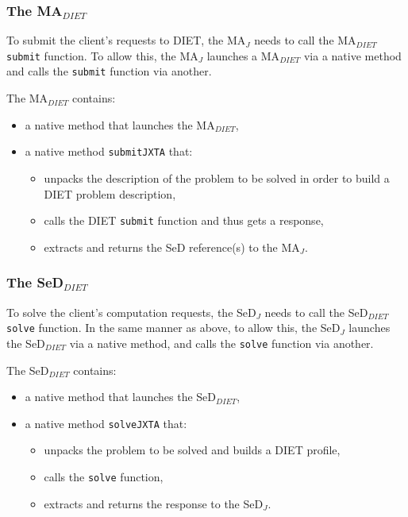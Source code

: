 \subsubsection{The MA$_{DIET}$}
\label{sssec:jnima}

To submit the client's requests to DIET, the MA$_{J}$ needs to call
the MA$_{DIET}$  \texttt{submit} function. To allow this, the MA$_{J}$
launches a MA$_{DIET}$ via a native method and calls the
\texttt{submit} function via another.

The MA$_{DIET}$ contains:

\begin{itemize}
\item{a native method that launches the MA$_{DIET}$,}
\item{a native method \texttt{submitJXTA} that:}
\begin{itemize}
\item{unpacks the description of the problem to be solved in order to
    build a DIET problem description,}
\item{calls the DIET \texttt{submit} function and thus gets a
    response,}
\item{extracts and returns the SeD reference(s) to the MA$_{J}$.}
  \end{itemize}
\end{itemize}

\subsubsection{The SeD$_{DIET}$}
\label{sssec:jnised}

To solve the client's computation requests, the SeD$_{J}$ needs to
call the SeD$_{DIET}$ \texttt{solve} function. In the same manner as
above, to allow this, the SeD$_{J}$ launches the SeD$_{DIET}$ via a
native method, and calls the \texttt{solve} function via another.

The SeD$_{DIET}$ contains:

\begin{itemize}
\item{a native method that launches the SeD$_{DIET}$,}
\item{a native method \texttt{solveJXTA} that:}
        \begin{itemize}
        \item{unpacks the problem to be solved and builds a DIET
            profile,}
        \item{calls the \texttt{solve} function,}
        \item{extracts and returns the response to the SeD$_{J}$.}
        \end{itemize}
\end{itemize}

